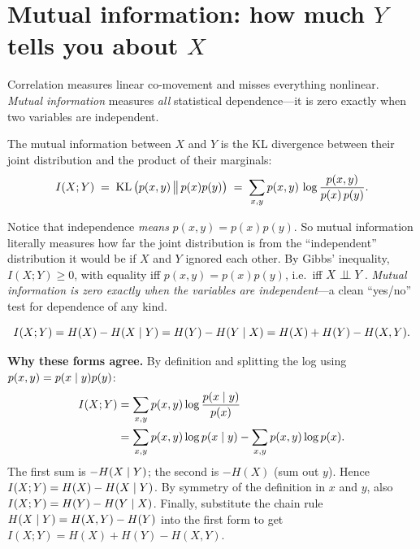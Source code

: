 \section{Mutual information: how much $Y$ tells you about $X$}
\label{ch33:mutual-info}

Correlation measures linear co-movement and misses everything nonlinear.
\emph{Mutual information} measures \emph{all} statistical dependence---it is zero exactly when two variables
are independent.

\begin{definition}
\label{ch33:def-mi}
The mutual information between $X$ and $Y$ is the KL divergence between their joint distribution and the
product of their marginals:
\[
  I(X; Y) \;=\; \operatorname{KL}\big(p(x,y) \,\big\|\, p(x)p(y)\big)
          \;=\; \sum_{x,y} p(x,y)\,\log\frac{p(x,y)}{p(x)\,p(y)}.
\]
\end{definition}

Notice that independence \emph{means} $p(x,y) = p(x)p(y)$. So mutual
information literally measures how far the joint distribution is from the ``independent'' distribution
it would be if $X$ and $Y$ ignored each other. By Gibbs' inequality, $I(X;Y) \ge 0$, with equality iff
$p(x,y) = p(x)p(y)$, i.e.\ iff $X \perp\!\!\!\perp Y$. \emph{Mutual information is zero exactly when the variables
are independent}---a clean ``yes/no'' test for dependence of any kind.

\begin{theorem}
\label{ch33:mi-entropy}
\[
  I(X;Y) = H(X) - H(X\mid Y) = H(Y) - H(Y\mid X) = H(X) + H(Y) - H(X,Y).
\]
\end{theorem}

\begin{whybox}
\textbf{Why these forms agree.} By definition and splitting the log using $p(x,y) = p(x\mid
y)p(y)$:
\begin{align*}
  I(X;Y) &= \sum_{x,y} p(x,y)\log\frac{p(x\mid y)}{p(x)} \\
         &= \sum_{x,y}p(x,y)\log p(x\mid y) - \sum_{x,y}p(x,y)\log p(x).
\end{align*}
The first sum is $-H(X\mid Y)$; the second is $-H(X)$ (sum out $y$). Hence $I(X;Y) = H(X) -
H(X\mid Y)$. By symmetry of the definition in $x$ and $y$, also $I(X;Y) = H(Y) - H(Y\mid X)$. Finally,
substitute the chain rule $H(X\mid Y) = H(X,Y) - H(Y)$ into the first form to get $I(X;Y) = H(X) + H(Y)
- H(X,Y)$.
\end{whybox}

